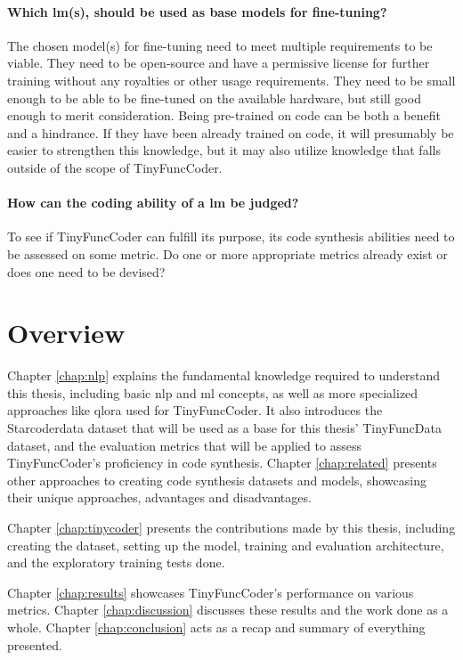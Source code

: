 \paragraph{Which \ac{lm}(s), should be used as base models for fine-tuning?}
The chosen model(s) for fine-tuning need to meet multiple requirements to be viable.
They need to be open-source and have a permissive license for further training without any royalties or other usage requirements.
They need to be small enough to be able to be fine-tuned on the available hardware, but still good enough to merit consideration.
Being pre-trained on code can be both a benefit and a hindrance.
If they have been already trained on code, it will presumably be easier to strengthen this knowledge, but it may also utilize knowledge that falls outside of the scope of TinyFuncCoder.

\paragraph{How can the coding ability of a \ac{lm} be judged?}
To see if TinyFuncCoder can fulfill its purpose, its code synthesis abilities need to be assessed on some metric.
Do one or more appropriate metrics already exist or does one need to be devised?


\section{Overview}
\label{sec:overview}

Chapter \ref{chap:nlp} explains the fundamental knowledge required to understand this thesis, including basic \ac{nlp} and \ac{ml} concepts, as well as more specialized approaches like \ac{qlora} used for TinyFuncCoder.
It also introduces the Starcoderdata dataset that will be used as a base for this thesis' TinyFuncData dataset, and the evaluation metrics that will be applied to assess TinyFuncCoder's proficiency in code synthesis.
Chapter \ref{chap:related} presents other approaches to creating code synthesis datasets and models, showcasing their unique approaches, advantages and disadvantages.

Chapter \ref{chap:tinycoder} presents the contributions made by this thesis, including creating the dataset, setting up the model, training and evaluation architecture, and the exploratory training tests done.

Chapter \ref{chap:results} showcases TinyFuncCoder's performance on various metrics.
Chapter \ref{chap:discussion} discusses these results and the work done as a whole.
Chapter \ref{chap:conclusion} acts as a recap and summary of everything presented.